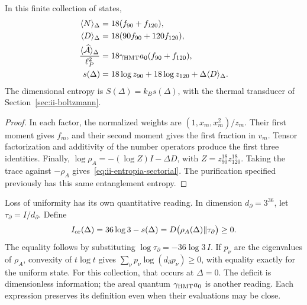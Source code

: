 \begin{proposition}
In this finite collection of states,
\begin{align}
 \langle N\rangle_\Delta&=18(f_{90}+f_{120}),\\
 \langle D\rangle_\Delta&=18(90f_{90}+120f_{120}),\\
 \frac{\langle\widehat{\mathcal A}\rangle_\Delta}{\ell_P^2}
 &=18\gamma_{\mathrm{HMT}}a_0(f_{90}+f_{120}),
 \label{eq:ii-area-media}\\
 s(\Delta)&=18\log z_{90}+18\log z_{120}
                  +\Delta\langle D\rangle_\Delta.
 \label{eq:ii-entropia-sectorial}
\end{align}
The dimensional entropy is $S(\Delta)=k_Bs(\Delta)$, with the
thermal transducer of Section~\ref{sec:ii-boltzmann}.
\end{proposition}
\begin{proof}
In each factor, the normalized weights are
$(1,x_m,x_m^2)/z_m$. Their first moment gives $f_m$, and their second
moment gives the first fraction in $v_m$. Tensor factorization
and additivity of the number operators produce the first three
identities. Finally,
$\log\rho_A=-(\log Z)I-\Delta D$, with
$Z=z_{90}^{18}z_{120}^{18}$. Taking the trace against $-\rho_A$
gives~\eqref{eq:ii-entropia-sectorial}. The purification specified
previously has this same entanglement entropy.
\end{proof}

Loss of uniformity has its own quantitative reading.
In dimension \(d_\partial=3^{36}\), let
\(\tau_\partial=I/d_\partial\). Define
\begin{equation}
 I_{\rm or}(\Delta)=36\log3-s(\Delta)
 =D\bigl(\rho_A(\Delta)\Vert\tau_\partial\bigr)\ge0.
 \label{eq:ii-area-deficit-informacional}
\end{equation}
The equality follows by substituting
\(\log\tau_\partial=-36\log3\,I\). If \(p_\nu\) are the
eigenvalues of \(\rho_A\), convexity of \(t\log t\) gives
\(\sum_\nu p_\nu\log(d_\partial p_\nu)\ge0\), with equality
exactly for the uniform state. For this collection, that occurs at
\(\Delta=0\). The deficit is dimensionless information; the areal
quantum \(\gamma_{\mathrm{HMT}}a_0\) is another reading. Each expression preserves
its definition even when their evaluations may be close.

